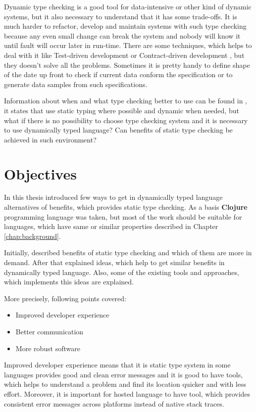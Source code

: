 Dynamic type checking is a good tool for data-intensive or other kind of dynamic
systems, but it also necessary to understand that it has some trade-offs. It is
much harder to refactor, develop and maintain systems with such type checking
because any even small change can break the system and nobody will know it until
fault will occur later in run-time. There are some techniques, which helps to
deal with it like Test-driven development \cite{beck2003test} or Contract-driven
development \cite{meyer2007contract}, but they doesn't solve all the problems.
Sometimes it is pretty handy to define shape of the date up front to check if
current data conform the specification or to generate data samples from such
specifications.

Information about when and what type checking better to use can be found in
\cite{meijer2004static}, it states that use static typing where possible and
dynamic when needed, but what if there is no possibility to choose type checking
system and it is necessary to use dynamically typed language? Can benefits of
static type checking be achieved in such environment?


\section{Objectives}
In this thesis introduced few ways to get in dynamically typed language
alternatives of benefits, which provides static type checking. As a basis
\textbf{Clojure} programming language was taken, but most of the work should be
suitable for languages, which have same or similar properties described in Chapter
\ref{chap:background}.

Initially, described benefits of static type checking and which of them are more
in demand. After that explained ideas, which help to get similar benefits in
dynamically typed language. Also, some of the existing tools and approaches,
which implements this ideas are explained.

More precisely, following points covered:
\begin{itemize}
\item Improved developer experience
\item Better communication
\item More robust software
\end{itemize}

Improved developer experience means that it is static type system in some
languages provides good and clean error messages and it is good to have tools,
which helps to understand a problem and find its location quicker and with less
effort. Moreover, it is important for hosted language to have tool, which
provides consistent error messages across platforms instead of native stack
traces.


